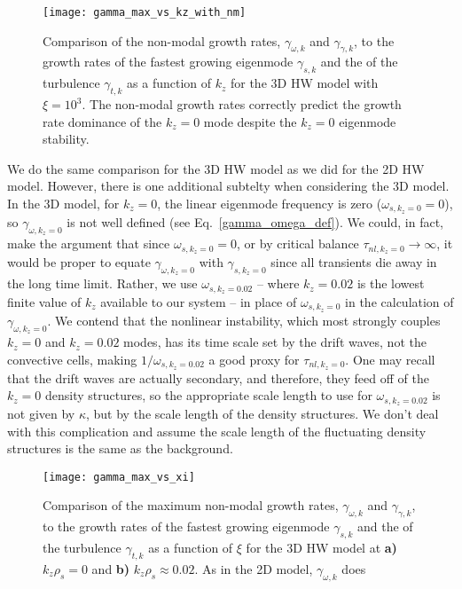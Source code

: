 \documentclass[letter,scriptaddress,twocolumn, prl,showkeys]{revtex4}
\begin{document}
\begin{figure}
\centerline{\texttt{[image: gamma\_max\_vs\_kz\_with\_nm]}}
\caption{Comparison of the non-modal growth rates, $\gamma_{\omega,k}$ and $\gamma_{\gamma,k}$, to the growth rates of the fastest growing eigenmode $\gamma_{s,k}$ 
and the of the turbulence $\gamma_{t,k}$ as a function of $k_z$ for the 3D HW model with $\xi = 10^3$. The non-modal growth rates correctly predict the growth rate dominance of the $k_z=0$ mode
despite the $k_z=0$ eigenmode stability.}
\label{gamma_max_vs_kz_with_nm}
\end{figure}

We do the same comparison for the 3D HW model as we did for the 2D HW model. However, there is one additional subtelty when considering the 3D model. In the 3D model, for $k_z=0$, the linear
eigenmode frequency is zero ($\omega_{s,k_z=0} = 0$), so $\gamma_{\omega,k_z=0}$ is not well defined (see Eq.~\ref{gamma_omega_def}). 
We could, in fact, make the argument that since $\omega_{s,k_z=0} = 0$, or by critical balance $\tau_{nl,k_z=0} \to \infty$, it would be proper to equate $\gamma_{\omega,k_z=0}$ with $\gamma_{s,k_z=0}$
since all transients die away in the long time limit. Rather, we use $\omega_{s,k_z=0.02}$ -- where $k_z=0.02$ is the lowest finite value of $k_z$ available to our system -- in place of
$\omega_{s,k_z=0}$ in the calculation of $\gamma_{\omega,k_z=0}$. We contend that the nonlinear instability, which most strongly couples $k_z=0$ and $k_z=0.02$ modes, has its time scale set
by the drift waves, not the convective cells, making $1/\omega_{s,k_z=0.02}$ a good proxy for $\tau_{nl,k_z=0}$. One may recall that the drift waves are actually secondary, and therefore, they feed
off of the $k_z=0$ density structures, so the appropriate scale length to use for $\omega_{s,k_z=0.02}$ is not given by $\kappa$, but by the scale length of the density structures. We don't deal
with this complication and assume the scale length of the fluctuating density structures is the same as the background.

\begin{figure}
\centerline{\texttt{[image: gamma\_max\_vs\_xi]}}
\caption{Comparison of the maximum non-modal growth rates, $\gamma_{\omega,k}$ and $\gamma_{\gamma,k}$, to the growth rates of the fastest growing eigenmode $\gamma_{s,k}$ 
and the of the turbulence $\gamma_{t,k}$ as a function of $\xi$ for the 3D HW model at {\bf a)} $k_z \rho_s = 0$ and {\bf b)} $k_z \rho_s \approx 0.02$. 
As in the 2D model, $\gamma_{\omega,k}$ does }
\label{gamma_max_vs_xi}
\end{figure}
\end{document}
